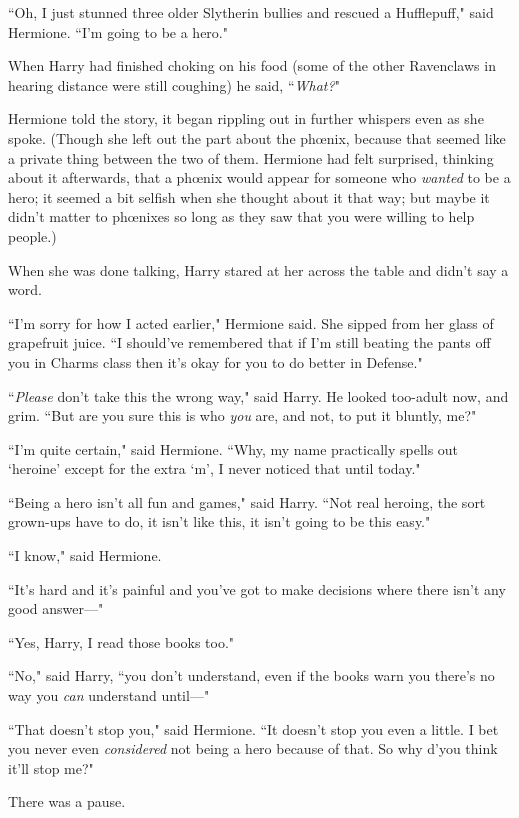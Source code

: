 ``Oh, I just stunned three older Slytherin bullies and rescued a Hufflepuff," said Hermione. ``I'm going to be a hero."

When Harry had finished choking on his food (some of the other Ravenclaws in hearing distance were still coughing) he said, ``\emph{What?}"

Hermione told the story, it began rippling out in further whispers even as she spoke. (Though she left out the part about the phœnix, because that seemed like a private thing between the two of them. Hermione had felt surprised, thinking about it afterwards, that a phœnix would appear for someone who \emph{wanted} to be a hero; it seemed a bit selfish when she thought about it that way; but maybe it didn't matter to phœnixes so long as they saw that you were willing to help people.)

When she was done talking, Harry stared at her across the table and didn't say a word.

``I'm sorry for how I acted earlier," Hermione said. She sipped from her glass of grapefruit juice. ``I should've remembered that if I'm still beating the pants off you in Charms class then it's okay for you to do better in Defense."

``\emph{Please} don't take this the wrong way," said Harry. He looked too-adult now, and grim. ``But are you sure this is who \emph{you} are, and not, to put it bluntly, me?"

``I'm quite certain," said Hermione. ``Why, my name practically spells out `heroine' except for the extra `m', I never noticed that until today."

``Being a hero isn't all fun and games," said Harry. ``Not real heroing, the sort grown-ups have to do, it isn't like this, it isn't going to be this easy."

``I know," said Hermione.

``It's hard and it's painful and you've got to make decisions where there isn't any good answer—"

``Yes, Harry, I read those books too."

``No," said Harry, ``you don't understand, even if the books warn you there's no way you \emph{can} understand until—"

``That doesn't stop you," said Hermione. ``It doesn't stop you even a little. I bet you never even \emph{considered} not being a hero because of that. So why d'you think it'll stop me?"

There was a pause.

